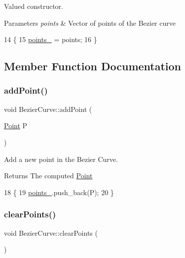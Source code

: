 Valued constructor. 


\begin{DoxyParams}{Parameters}
{\em points} & Vector of points of the Bezier curve \\
\hline
\end{DoxyParams}

\begin{DoxyCode}
14                                                 \{
15     \mbox{\hyperlink{class_bezier_curve_a73c8f89d9002be75295e6a0546547189}{points\_}} = points;
16 \}
\end{DoxyCode}


\subsection{Member Function Documentation}
\mbox{\label{class_bezier_curve_a38d16c18b36ae45619b05e26e226cf34}} 
\subsubsection{\texorpdfstring{add\+Point()}{addPoint()}}
{\footnotesize\ttfamily void Bezier\+Curve\+::add\+Point (\begin{DoxyParamCaption}\item[{\mbox{\hyperlink{class_point}{Point}}}]{P }\end{DoxyParamCaption})}



Add a new point in the Bezier Curve. 

\begin{DoxyReturn}{Returns}
The computed \mbox{\hyperlink{class_point}{Point}} 
\end{DoxyReturn}

\begin{DoxyCode}
18                                   \{
19     \mbox{\hyperlink{class_bezier_curve_a73c8f89d9002be75295e6a0546547189}{points\_}}.push\_back(P);
20 \}
\end{DoxyCode}
\mbox{\label{class_bezier_curve_a0ba8ce66d5af5971ae6a1b506029728e}} 
\subsubsection{\texorpdfstring{clear\+Points()}{clearPoints()}}
{\footnotesize\ttfamily void Bezier\+Curve\+::clear\+Points (\begin{DoxyParamCaption}{ }\end{DoxyParamCaption})}




